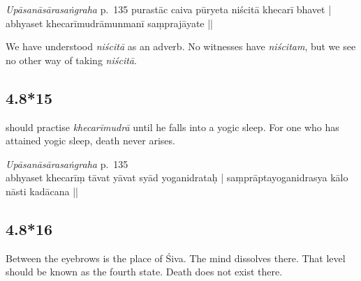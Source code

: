 \begin{ekdosis}

\begin{testimonia}[hp04_008_14]
\emph{Upāsanāsārasaṅgraha} p.~135
purastāc caiva pūryeta niścitā khecarī bhavet |
abhyaset khecarīmudrāmunmanī saṃprajāyate ||
\end{testimonia}

\begin{philcomm}[hp04_008_14]
We have understood \emph{niścitā} as an adverb. No witnesses have \emph{niścitam}, but we see no other way of taking \emph{niścitā}.
\end{philcomm}

\subsection*{4.8*15}
\begin{translation} should practise \emph{khecarīmudrā} until he falls into a yogic sleep. For one who has attained yogic sleep, death never arises.
\end{translation}


\begin{testimonia}[hp04_008_15]
\emph{Upāsanāsārasaṅgraha} p.~135\\
abhyaset khecarīṃ tāvat yāvat syād yoganidrataḥ |
saṃprāptayoganidrasya kālo nāsti kadācana ||
\end{testimonia}

\begin{philcomm}[hp04_008_15]
\end{philcomm}



\subsection*{4.8*16}
\begin{translation}[hp04_008_16]
Between the eyebrows is the place of Śiva. The mind dissolves there. That level should be known as the fourth state. Death does not exist there.
\end{translation}



\end{ekdosis}
